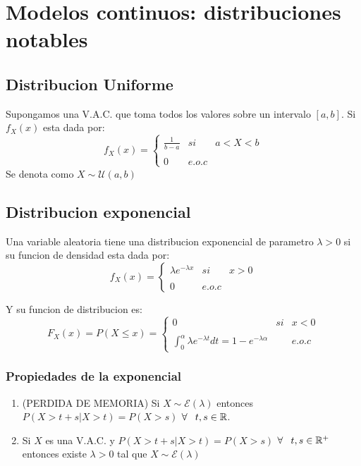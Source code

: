 \documentclass[titlepage,a4paper]{article}
\begin{document}
\section{Modelos continuos: distribuciones notables}
\subsection{Distribucion Uniforme}
Supongamos una V.A.C. que toma todos los valores sobre un intervalo $[a,b]$. Si $f_{X}(x)$ esta dada por:
$$f_{X}(x)= \left\{ \begin{array}{lcc}
    \frac{1}{b-a} &   si  & a<X<b \\
    \\0 &  e.o.c 
    \end{array}
\right.$$
Se denota como $X \sim \mathcal{U} (a,b)$
\subsection{Distribucion exponencial}
Una variable aleatoria tiene una distribucion exponencial de parametro $\lambda > 0$ si su funcion de densidad esta dada por:
$$f_{X}(x)= \left\{ \begin{array}{lcc}
    \lambda e^{-\lambda x} &   si  & x>0 \\
    \\0 &  e.o.c 
    \end{array}
\right.$$

Y su funcion de distribucion es:
\begin{equation*}
    F_{X}(x)=P(X \leq x) = \left\{ \begin{array}{lcc}
        0 &   si  & x<0 \\
        \\ \int_{0}^{\alpha} \lambda e^{-\lambda t} dt = 1- e^{-\lambda \alpha} & &  e.o.c 
        \end{array}
    \right.
\end{equation*}
\subsubsection*{Propiedades de la exponencial}
\begin{enumerate}
    \item (PERDIDA DE MEMORIA) Si $X \sim \mathcal{E} (\lambda)$ entonces $P(X>t+s|X>t) = P(X>s)$  $\forall \hspace{8px} t,s  \in \mathbb{R}$.
    \item Si $X$ es una V.A.C. y $P(X>t+s|X>t) = P(X>s)$  $\forall \hspace{8px} t,s \in \mathbb{R}^{+}$ entonces existe $\lambda >0 $ tal que $X \sim \mathcal{E}(\lambda)$
\end{enumerate}
\end{document}
